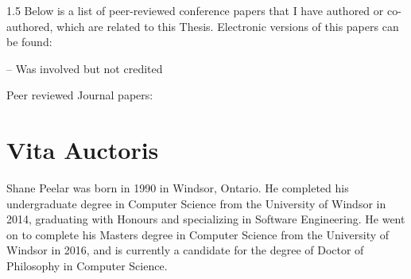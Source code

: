 \documentclass[fleqn, oneside, 12pt]{book}
\theoremstyle{definitionsty}
\newcommand{\uwinonehalfspacelen}{1.5}
\newcommand{\uwindefaultspacelen}{\uwinonehalfspacelen}
\newenvironment{uwindefaultspaceenv}%
{\begin{spacing}{\uwindefaultspacelen}}%
	{\end{spacing}}
\begin{document}
\begin{uwindefaultspaceenv}
Below is a list of peer-reviewed conference papers that I have authored or co-authored, which are related to this Thesis.  Electronic versions of this papers can be found: %



\cite{donais2013system} 

\cite{peelar2017windsor} 

\cite{peelar2018toolpath} 

\cite{frost2014demonstration}  -- Was involved but not credited

Peer reviewed Journal papers:

\cite{peelar2019real} 



\chapter*{Vita Auctoris}

Shane Peelar was born in 1990 in Windsor, Ontario.  He completed his undergraduate degree in Computer Science from the University of Windsor in 2014, graduating with Honours and specializing in Software Engineering.  He went on to complete his Masters degree in Computer Science from the University of Windsor in 2016, and is currently a candidate for the degree of Doctor of Philosophy in Computer Science.

\end{uwindefaultspaceenv}
\end{document}
